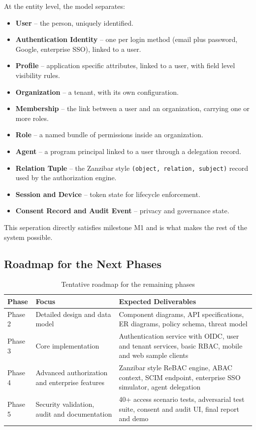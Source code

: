 \documentclass[11pt,a4paper]{article}
\begin{document}
At the entity level, the model separates:

\begin{itemize}[leftmargin=1.5em,itemsep=2pt]
    \item \textbf{User} -- the person, uniquely identified.
    \item \textbf{Authentication Identity} -- one per login method (email plus password, Google, enterprise SSO), linked to a user.
    \item \textbf{Profile} -- application specific attributes, linked to a user, with field level visibility rules.
    \item \textbf{Organization} -- a tenant, with its own configuration.
    \item \textbf{Membership} -- the link between a user and an organization, carrying one or more roles.
    \item \textbf{Role} -- a named bundle of permissions inside an organization.
    \item \textbf{Agent} -- a program principal linked to a user through a delegation record.
    \item \textbf{Relation Tuple} -- the Zanzibar style \texttt{(object, relation, subject)} record used by the authorization engine.
    \item \textbf{Session and Device} -- token state for lifecycle enforcement.
    \item \textbf{Consent Record and Audit Event} -- privacy and governance state.
\end{itemize}

This seperation directly satisfies milestone M1 and is what makes the rest of the system possible.

\subsection{Roadmap for the Next Phases}

\begin{table}[h!]
\centering
\small
\caption{Tentative roadmap for the remaining phases}
\label{tab:roadmap}
\begin{tabular}{p{2.2cm} p{5cm} p{6.5cm}}
\toprule
\textbf{Phase} & \textbf{Focus} & \textbf{Expected Deliverables} \\
\midrule
Phase 2 & Detailed design and data model & Component diagrams, API specifications, ER diagrams, policy schema, threat model \\
Phase 3 & Core implementation & Authentication service with OIDC, user and tenant services, basic RBAC, mobile and web sample clients \\
Phase 4 & Advanced authorization and enterprise features & Zanzibar style ReBAC engine, ABAC context, SCIM endpoint, enterprise SSO simulator, agent delegation \\
Phase 5 & Security validation, audit and documentation & 40+ access scenario tests, adversarial test suite, consent and audit UI, final report and demo \\
\bottomrule
\end{tabular}
\end{table}
\end{document}
